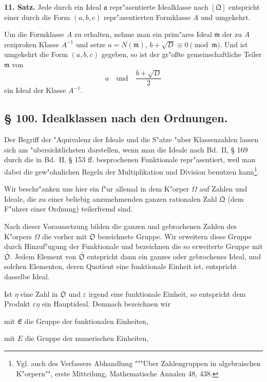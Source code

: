 \documentclass[12pt,a4paper]{article}
\theoremstyle{plain}
\begin{document}
\textbf{11. Satz.} Jede durch ein Ideal $\mathfrak{a}$ repr"asentierte Idealklasse nach $[\mathfrak{Q}]$ entspricht einer durch die Form $(a, b, c)$ repr"asentierten Formklasse $A$ und umgekehrt.

Um die Formklasse $A$ zu erhalten, nehme man ein prim"ares Ideal $\mathfrak{m}$ der zu $A$ reziproken Klasse $A^{-1}$ und setze $a = N(\mathfrak{m})$, $b + \sqrt{D} \equiv 0 \pmod{\mathfrak{m}}$. Und ist umgekehrt die Form $(a, b, c)$ gegeben, so ist der gr"o\ss te gemeinschaftliche Teiler $\mathfrak{m}$ von
\[
a\quad \text{und}\quad \frac{b + \sqrt{D}}{2}
\]
ein Ideal der Klasse $A^{-1}$.

\subsection*{\S{} 100. Idealklassen nach den Ordnungen.}

Der Begriff der "Aquivalenz der Ideale und die S"atze "uber Klassenzahlen lassen sich am "ubersichtlichsten darstellen, wenn man die Ideale nach Bd.~II, \S{} 169 durch die in Bd.~II, \S{} 153 ff. besprochenen Funktionale repr"asentiert, weil man dabei die gew"ohnlichen Regeln der Multiplikation und Division benutzen kann\footnote{Vgl. auch des Verfassers Abhandlung """Uber Zahlengruppen in algebraischen K"orpern"", erste Mitteilung, Mathematische Annalen 48, 438.}.

Wir beschr"anken uns hier ein f"ur allemal in dem K"orper $\Omega$ auf Zahlen und Ideale, die zu einer beliebig anzunehmenden ganzen rationalen Zahl $\mathfrak{Q}$ (dem F"uhrer einer Ordnung) teilerfremd sind.

Nach dieser Voraussetzung bilden die ganzen und gebrochenen Zahlen des K"orpers $\Omega$ die vorher mit $\mathfrak{O}$ bezeichnete Gruppe. Wir erweitern diese Gruppe durch Hinzuf"ugung der Funktionale und bezeichnen die so erweiterte Gruppe mit $\bar{\mathfrak{O}}$. Jedem Element von $\bar{\mathfrak{O}}$ entspricht dann ein ganzes oder gebrochenes Ideal, und solchen Elementen, deren Quotient eine funktionale Einheit ist, entspricht dasselbe Ideal.

Ist $\eta$ eine Zahl in $\mathfrak{O}$ und $\varepsilon$ irgend eine funktionale Einheit, so entspricht dem Produkt $\varepsilon\eta$ ein Hauptideal. Demnach bezeichnen wir

mit $\mathfrak{E}$ die Gruppe der funktionalen Einheiten,

mit $E$ die Gruppe der numerischen Einheiten,
\end{document}
